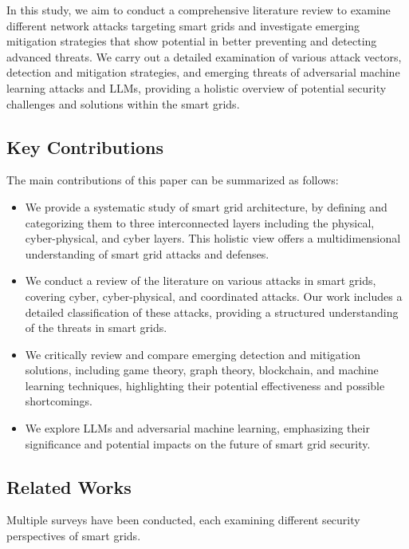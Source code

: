 \documentclass[10pt, journal]{IEEEtran}
\begin{document}
In this study, we aim to conduct a comprehensive literature review to examine different network attacks targeting smart grids and investigate emerging mitigation strategies that show potential in better preventing and detecting advanced threats. We carry out a detailed examination of various attack vectors, detection and mitigation strategies, and emerging threats of adversarial machine learning attacks and LLMs, providing a holistic overview of potential security challenges and solutions within the smart grids.

\subsection{Key Contributions}
The main contributions of this paper can be summarized as follows:

\begin{itemize}

\item We provide a systematic study of smart grid architecture, by defining and categorizing them to three interconnected layers including the physical, cyber-physical, and cyber layers. This holistic view offers a multidimensional understanding of smart grid attacks and defenses. 

\item We conduct a review of the literature on various attacks in smart grids, covering cyber, cyber-physical, and coordinated attacks. Our work includes a detailed classification of these attacks, providing a structured understanding of the threats in smart grids. 
				
\item We critically review and compare emerging detection and mitigation solutions, including game theory, graph theory, blockchain, and machine learning techniques, highlighting their potential effectiveness and possible shortcomings.

\item We explore LLMs and adversarial machine learning, emphasizing their significance and potential impacts on the future of smart grid security.

\end{itemize}

\subsection{Related Works}

Multiple surveys have been conducted, each examining different security perspectives of smart grids.
\end{document}
